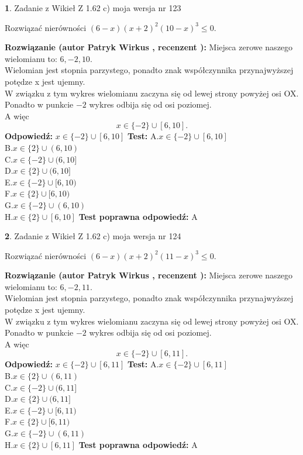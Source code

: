 \documentclass[12pt, a4paper]{article}
\theoremstyle{definition} %
\newtheorem{zad}{}
\newcommand{\zadStart}[1]{\begin{zad}#1\newline}
\newcommand{\zadStop}{\end{zad}}
\newcommand{\rozwStart}[2]{\noindent \textbf{Rozwiązanie (autor #1 , recenzent #2): }\newline}
\newcommand{\rozwStop}{\newline}
\newcommand{\odpStart}{\noindent \textbf{Odpowiedź:}\newline}
\newcommand{\odpStop}{\newline}
\newcommand{\testStart}{\noindent \textbf{Test:}\newline}
\newcommand{\testStop}{\newline}
\newcommand{\kluczStart}{\noindent \textbf{Test poprawna odpowiedź:}\newline}
\newcommand{\kluczStop}{\newline}
\begin{document}
\zadStart{Zadanie z Wikieł Z 1.62 c) moja wersja nr 123}

Rozwiązać nierówności $(6-x)(x+2)^{2}(10-x)^{3}\le0$.
\zadStop
\rozwStart{Patryk Wirkus}{}
Miejsca zerowe naszego wielomianu to: $6, -2, 10$.\\
Wielomian jest stopnia parzystego, ponadto znak współczynnika przy\linebreak najwyższej potędze x jest ujemny.\\ W związku z tym wykres wielomianu zaczyna się od lewej strony powyżej osi OX.\\
Ponadto w punkcie $-2$ wykres odbija się od osi poziomej.\\
A więc $$x \in \{-2\} \cup [6,10].$$
\rozwStop
\odpStart
$x \in \{-2\} \cup [6,10]$
\odpStop
\testStart
A.$x \in \{-2\} \cup [6,10]$\\
B.$x \in \{2\} \cup (6,10)$\\
C.$x \in \{-2\} \cup (6,10]$\\
D.$x \in \{2\} \cup (6,10]$\\
E.$x \in \{-2\} \cup [6,10)$\\
F.$x \in \{2\} \cup [6,10)$\\
G.$x \in \{-2\} \cup (6,10)$\\
H.$x \in \{2\} \cup [6,10]$
\testStop
\kluczStart
A
\kluczStop



\zadStart{Zadanie z Wikieł Z 1.62 c) moja wersja nr 124}

Rozwiązać nierówności $(6-x)(x+2)^{2}(11-x)^{3}\le0$.
\zadStop
\rozwStart{Patryk Wirkus}{}
Miejsca zerowe naszego wielomianu to: $6, -2, 11$.\\
Wielomian jest stopnia parzystego, ponadto znak współczynnika przy\linebreak najwyższej potędze x jest ujemny.\\ W związku z tym wykres wielomianu zaczyna się od lewej strony powyżej osi OX.\\
Ponadto w punkcie $-2$ wykres odbija się od osi poziomej.\\
A więc $$x \in \{-2\} \cup [6,11].$$
\rozwStop
\odpStart
$x \in \{-2\} \cup [6,11]$
\odpStop
\testStart
A.$x \in \{-2\} \cup [6,11]$\\
B.$x \in \{2\} \cup (6,11)$\\
C.$x \in \{-2\} \cup (6,11]$\\
D.$x \in \{2\} \cup (6,11]$\\
E.$x \in \{-2\} \cup [6,11)$\\
F.$x \in \{2\} \cup [6,11)$\\
G.$x \in \{-2\} \cup (6,11)$\\
H.$x \in \{2\} \cup [6,11]$
\testStop
\kluczStart
A
\kluczStop
\end{document}
